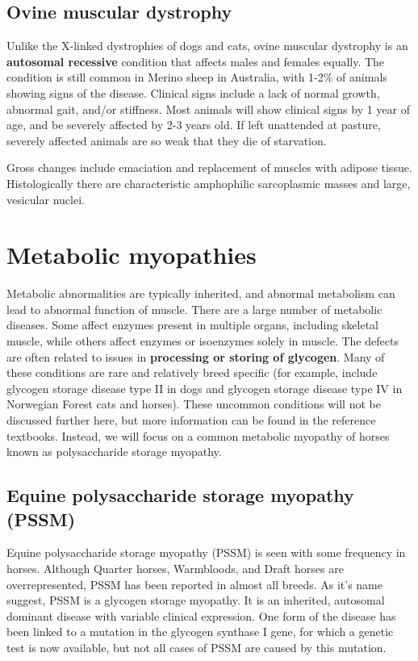 \documentclass[openany]{book}
\begin{document}
\subsection{Ovine muscular dystrophy}\label{ovine-muscular-dystrophy}

Unlike the X-linked dystrophies of dogs and cats, ovine muscular
dystrophy is an \textbf{autosomal recessive} condition that affects
males and females equally. The condition is still common in Merino sheep
in Australia, with 1-2\% of animals showing signs of the disease.
Clinical signs include a lack of normal growth, abnormal gait, and/or
stiffness. Most animals will show clinical signs by 1 year of age, and
be severely affected by 2-3 years old. If left unattended at pasture,
severely affected animals are so weak that they die of starvation.

Gross changes include emaciation and replacement of muscles with adipose
tissue. Histologically there are characteristic amphophilic sarcoplasmic
masses and large, vesicular nuclei.

\section{Metabolic myopathies}\label{metabolic-myopathies}

Metabolic abnormalities are typically inherited, and abnormal metabolism
can lead to abnormal function of muscle. There are a large number of
metabolic diseases. Some affect enzymes present in multiple organs,
including skeletal muscle, while others affect enzymes or isoenzymes
solely in muscle. The defects are often related to issues in
\textbf{processing or storing of glycogen}. Many of these conditions are
rare and relatively breed specific (for example, include glycogen
storage disease type II in dogs and glycogen storage disease type IV in
Norwegian Forest cats and horses). These uncommon conditions will not be
discussed further here, but more information can be found in the
reference textbooks. Instead, we will focus on a common metabolic
myopathy of horses known as polysaccharide storage myopathy.

\hypertarget{equine-polysaccharide-storage-myopathy-pssm}{\subsection{Equine
polysaccharide storage myopathy
(PSSM)}\label{equine-polysaccharide-storage-myopathy-pssm}}

Equine polysaccharide storage myopathy (PSSM) is seen with some
frequency in horses. Although Quarter horses, Warmbloods, and Draft
horses are overrepresented, PSSM has been reported in almost all breeds.
As it's name suggest, PSSM is a glycogen storage myopathy. It is an
inherited, autosomal dominant disease with variable clinical expression.
One form of the disease has been linked to a mutation in the glycogen
synthase I gene, for which a genetic test is now available, but not all
cases of PSSM are caused by this mutation.
\end{document}
